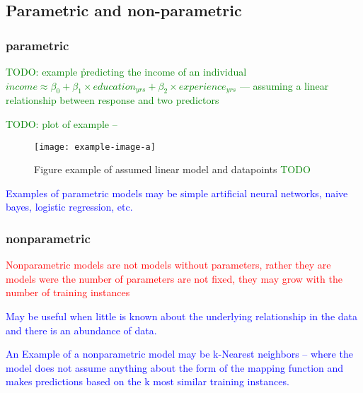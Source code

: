 \subsection{Parametric and non-parametric}

\subsubsection{parametric}


\textcolor{green}{TODO: example \r{predicting the income of an individual $income \approx \beta_0 + \beta_1 \times education_{yrs} + \beta_2 \times experience_{yrs}$ --- assuming a linear relationship between response and two predictors}}

\textcolor{green}{TODO: plot of example -- }

\begin{figure}[htp]
	\centering
	\texttt{[image: example-image-a]}\hfil
	\caption{Figure example of assumed linear model and datapoints \textcolor{green}{TODO}}
	\label{fig:basics_para_assume_linear}
\end{figure}



\textcolor{blue}{Examples of parametric models may be simple artificial neural networks, naive bayes, logistic regression, etc.}

\subsubsection{nonparametric}

\textcolor{red}{Nonparametric models are not models without parameters, rather they are models were the number of parameters are not fixed, they may grow with the number of training instances}

\textcolor{blue}{May be useful when little is known about the underlying relationship in the data and there is an abundance of data.}

\textcolor{blue}{An Example of a nonparametric model may be k-Nearest neighbors -- where the model does not assume anything about the form of the mapping function and makes predictions based on the k most similar training instances.}

